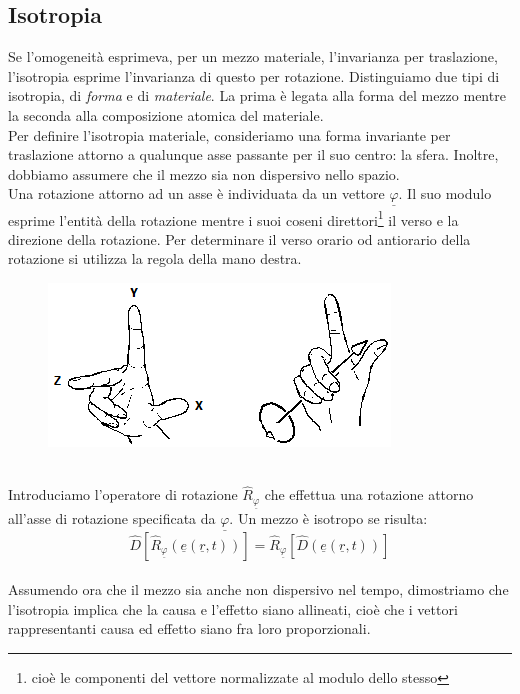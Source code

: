 \documentclass{book}
\begin{document}
        \subsection{Isotropia}
            Se l'omogeneità esprimeva, per un mezzo materiale, l'invarianza per traslazione, l'isotropia esprime l'invarianza di questo per rotazione. Distinguiamo due tipi di isotropia, di \textit{forma} e di \textit{materiale}. La prima è legata alla forma del mezzo mentre la seconda alla composizione atomica del materiale. \\
            Per definire l'isotropia materiale, consideriamo una forma invariante per traslazione attorno a qualunque asse passante per il suo centro: la sfera. Inoltre, dobbiamo assumere che il mezzo sia non dispersivo nello spazio. \\
            Una rotazione attorno ad un asse è individuata da un vettore $\underline{\varphi}$. Il suo modulo esprime l'entità della rotazione mentre i suoi coseni direttori\footnote{cioè le componenti del vettore normalizzate al modulo dello stesso} il verso e la direzione della rotazione. Per determinare il verso orario od antiorario della rotazione si utilizza la regola della mano destra.
            \begin{figure}[h!]
                \centering
                \includegraphics[width=0.5\linewidth]{img//Chapter_one/chaptOneManoDestra.png}
            \end{figure}
            \\
            Introduciamo l'operatore di rotazione $\hat{R}_{\underline{\varphi}}$ che effettua una rotazione attorno all'asse di rotazione specificata da $\underline{\varphi}$. Un mezzo è isotropo se risulta:
            \begin{equation}
                \hat{D}[\hat{R}_{\underline{\varphi}}(\underline{e}(\underline{r}, t))] = \hat{R}_{\underline{\varphi}}[\hat{D}(\underline{e}(\underline{r}, t))]  
            \end{equation}
            \\
            Assumendo ora che il mezzo sia anche non dispersivo nel tempo, dimostriamo che l'isotropia implica che la causa e l'effetto siano allineati, cioè che i vettori rappresentanti causa ed effetto siano fra loro proporzionali. \\
\end{document}
